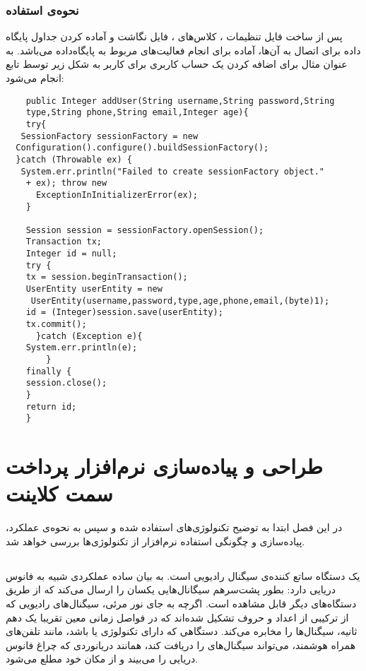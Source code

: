 \documentclass[oneside]{report}
\begin{document}
	 \subsection{نحوه‌ی استفاده}	
	پس از ساخت فایل تنظیمات ، کلاس‌های 
	{\normalsize {}}، فایل نگاشت و آماده کردن جداول پایگاه داده برای اتصال به آن‌ها، 
	{\normalsize {}}
	 آماده برای انجام فعالیت‌های مربوط به پایگاه‌داده می‌باشد. 
	 به عنوان مثال برای اضافه کردن یک حساب کاربری برای کاربر به شکل زیر توسط تابع 
	 	{\normalsize {}}
	 انجام می‌شود: 
	\begin{latin}
	\begin{verbatim}
	public Integer addUser(String username,String password,String 
	type,String phone,String email,Integer age){
	try{
   SessionFactory sessionFactory = new
  Configuration().configure().buildSessionFactory(); 
  }catch (Throwable ex) {
   System.err.println("Failed to create sessionFactory object."
    + ex); throw new 
	  ExceptionInInitializerError(ex);
	}
	
	Session session = sessionFactory.openSession();
	Transaction tx;
	Integer id = null;
	try {
	tx = session.beginTransaction();
	UserEntity userEntity = new
	 UserEntity(username,password,type,age,phone,email,(byte)1);
	id = (Integer)session.save(userEntity);
	tx.commit();
	  }catch (Exception e){
	System.err.println(e);
      	}
	finally {
	session.close();
	}
	return id;
	}
	\end{verbatim}
	
\end{latin}		 
	 

	
		
		\chapter{طراحی و پیاده‌سازی نرم‌افزار پرداخت سمت کلاینت}\label{clientimplementation}
در این فصل ابتدا به توضیح تکنولوژی‌های استفاده شده و سپس به نحوه‌ی عملکرد،  پیاده‌سازی و چگونگی استفاده نرم‌افزار از تکنولوژی‌ها بررسی خواهد شد.

\section{{\normalsize {}}}
         {\normalsize {}} 
یک دستگاه ساتع کننده‌ی سیگنال رادیویی 
         {\normalsize {}} 
         است.
به بیان ساده 
         {\normalsize {}} 
         عملکردی شبیه به فانوس دریایی دارد: 
        بطور پشت‌سرهم سیگانال‌هایی یکسان را ارسال می‌کند که از طریق دستگاه‌های دیگر قابل مشاهده است. 
       اگرچه به جای نور مرئی، سیگنال‌های رادیویی که از ترکیبی از اعداد و حروف تشکیل شده‌اند که در فواصل زمانی معین تقریبا یک دهم ثانیه،  سیگنال‌ها را مخابره می‌کند. دستگاهی که دارای تکنولوژی 
                {\normalsize {}} 
    یا 
                        {\normalsize {}} 
      باشد، مانند تلفن‌های همراه هوشمند، می‌تواند سیگنال‌های 
               {\normalsize {}} 
   را دریافت کند، همانند دریانوردی که چراغ فانوس دریایی را می‌بیند و از مکان خود مطلع می‌شود. 
   
\end{document}
